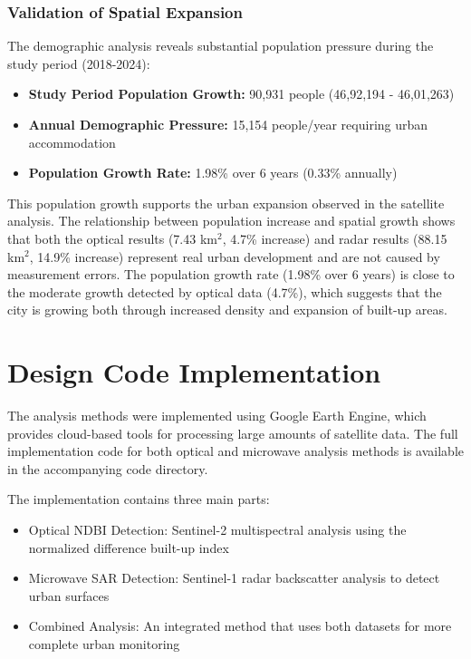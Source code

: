 \documentclass[conference]{IEEEtran}
\begin{document}
\subsubsection{Validation of Spatial Expansion}
The demographic analysis reveals substantial population pressure during the study period (2018-2024):
\begin{itemize}
    \item \textbf{Study Period Population Growth:} 90,931 people (46,92,194 - 46,01,263)
    \item \textbf{Annual Demographic Pressure:} 15,154 people/year requiring urban accommodation
    \item \textbf{Population Growth Rate:} 1.98\% over 6 years (0.33\% annually)
\end{itemize}

This population growth supports the urban expansion observed in the satellite analysis. The relationship between population increase and spatial growth shows that both the optical results (7.43 km$^2$, 4.7\% increase) and radar results (88.15 km$^2$, 14.9\% increase) represent real urban development and are not caused by measurement errors. The population growth rate (1.98\% over 6 years) is close to the moderate growth detected by optical data (4.7\%), which suggests that the city is growing both through increased density and expansion of built-up areas.

\section{Design Code Implementation}

The analysis methods were implemented using Google Earth Engine, which provides cloud-based tools for processing large amounts of satellite data. The full implementation code for both optical and microwave analysis methods is available in the accompanying code directory.

The implementation contains three main parts:
\begin{itemize}
    \item Optical NDBI Detection: Sentinel-2 multispectral analysis using the normalized difference built-up index
    \item Microwave SAR Detection: Sentinel-1 radar backscatter analysis to detect urban surfaces
    \item Combined Analysis: An integrated method that uses both datasets for more complete urban monitoring
\end{itemize}
\end{document}
